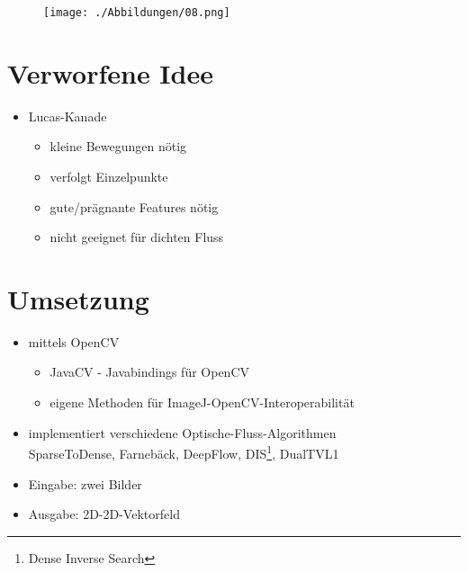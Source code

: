 \documentclass[10pt]{beamer}
\begin{document}
\begin{frame}

	\begin{figure}[h]
	\centering
	\texttt{[image: ./Abbildungen/08.png]}
	\label{img:bsp4}
	\end{figure}

\end{frame}

\section{Verworfene Idee}
\begin{frame}{\secname}

\begin{itemize}
	\item Lucas-Kanade
	\begin{itemize}
	\item kleine Bewegungen nötig
	\item verfolgt Einzelpunkte
	\item gute/prägnante Features nötig
	\item nicht geeignet für dichten Fluss
	\end{itemize}
\end{itemize}

\end{frame}

\section{Umsetzung}
\begin{frame}{\secname}
	
	\begin{itemize}
	
		\item mittels OpenCV
		\begin{itemize}
			\item JavaCV - Javabindings für OpenCV
			\item eigene Methoden für ImageJ-OpenCV-Interoperabilität
		\end{itemize}
		\item implementiert verschiedene Optische-Fluss-Algorithmen
			\\ SparseToDense, Farnebäck, DeepFlow, DIS\footnote{Dense Inverse Search}, DualTVL1
		\item Eingabe: zwei Bilder
		\item Ausgabe: 2D-2D-Vektorfeld
		
	\end{itemize}		
	
\end{frame}
\end{document}
